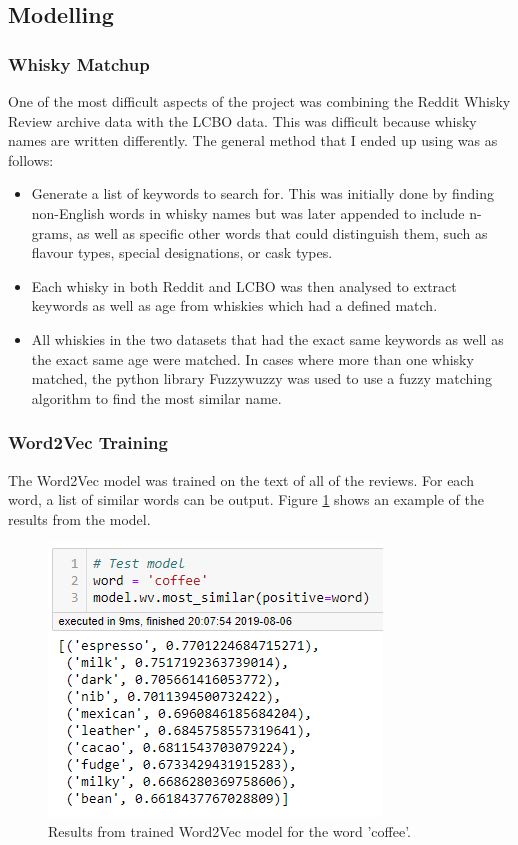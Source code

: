 \documentclass{article}
\begin{document}
\subsection{Modelling}

\subsubsection{Whisky Matchup}
One of the most difficult aspects of the project was combining the Reddit Whisky Review archive data with the LCBO data. This was difficult because whisky names are written differently. The general method that I ended up using was as follows:

\begin{itemize}
    \item Generate a list of keywords to search for. This was initially done by finding non-English words in whisky names but was later appended to include n-grams, as well as specific other words that could distinguish them, such as flavour types, special designations, or cask types.
    \item Each whisky in both Reddit and LCBO was then analysed to extract keywords as well as age from whiskies which had a defined match.
    \item All whiskies in the two datasets that had the exact same keywords as well as the exact same age were matched. In cases where more than one whisky matched, the python library Fuzzywuzzy was used to use a fuzzy matching algorithm to find the most similar name.
\end{itemize}

\subsubsection{Word2Vec Training}

The Word2Vec model was trained on the text of all of the reviews. For each word, a list of similar words can be output. Figure \ref{fig:word2vec} shows an example of the results from the model.

\begin{figure}[h]
\includegraphics{word2vec}
\centering
\caption{Results from trained Word2Vec model for the word 'coffee'.}
\label{fig:word2vec}
\end{figure}  
\end{document}
